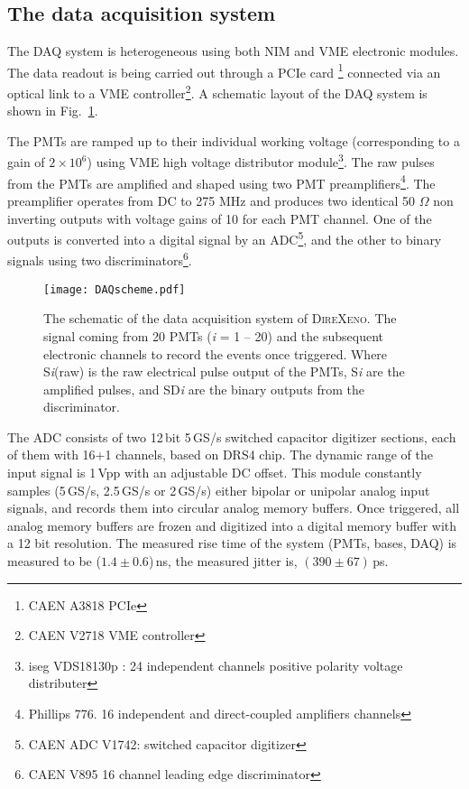 \subsection{The data acquisition system }
\label{sec:DAQ}



The DAQ system is heterogeneous using both 
NIM and VME electronic modules. The data readout is being carried out through a PCIe card \footnote{CAEN A3818 PCIe}  connected via an optical link to a VME controller\footnote{CAEN V2718 VME controller}. A schematic layout of the DAQ system is shown in Fig.~{\ref{Fig:DAQscheme}}. 

The PMTs are ramped up to their individual working voltage (corresponding to a gain of $2\times10^6$) using VME high voltage distributor module\footnote{iseg VDS18130p : 
24 independent channels positive polarity voltage distributer}. The raw pulses from the PMTs are amplified and shaped using 
two PMT preamplifiers\footnote{Phillips 776. 16 independent and direct-coupled amplifiers channels}. The preamplifier operates 
from DC to 275 MHz and produces two identical 50 $\Omega$ non inverting outputs with voltage gains of 10 for each PMT channel. One 
of the outputs is converted into a digital signal by an ADC\footnote{CAEN ADC V1742: switched capacitor digitizer}, and the other to 
binary signals using two discriminators\footnote{CAEN V895 16 channel leading edge discriminator}.

\begin{figure}[h]
   \centering
   \texttt{[image: DAQscheme.pdf]}
   \caption{The schematic of the data acquisition system of \textsc{DireXeno}. The 			signal coming from 20 PMTs ({\it i} = 1 -- 20) and the subsequent electronic channels to record the events once triggered. Where S{\it i}(raw) is the raw electrical pulse output of the PMTs, S{\it i} are the amplified pulses, and SD{\it i} are the binary outputs from the discriminator.
}
   \label{Fig:DAQscheme}
\end{figure}


The ADC consists of two 12\,bit 5\,GS/s switched capacitor digitizer sections, 
each of them with 16+1 channels, based on DRS4 chip. The dynamic range of the input signal is 1\,Vpp with an adjustable DC offset. This module constantly samples (5\,GS/s, 2.5\,GS/s or 2\,GS/s) either bipolar or unipolar analog input 
signals, and records them into circular 
analog memory buffers. Once triggered, all analog memory 
buffers are frozen and digitized into a digital memory buffer 
with a 12 bit resolution. The measured rise time of the system (PMTs, bases, DAQ) is measured to be ($1.4 \pm 0.6$)\,ns, the measured jitter is, $(390 \pm 67)$\,ps. 

